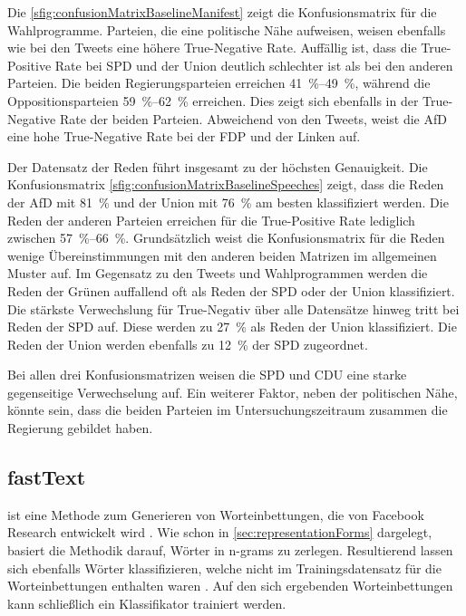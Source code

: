 Die \autoref{sfig:confusionMatrixBaselineManifest} zeigt die Konfusionsmatrix für die Wahlprogramme. Parteien, die eine politische Nähe aufweisen, weisen ebenfalls wie bei den Tweets eine höhere True-Negative Rate. Auffällig ist, dass die True-Positive Rate bei \ac{SPD} und der Union deutlich schlechter ist als bei den anderen Parteien. Die beiden Regierungsparteien erreichen \SIrange{41}{49}{\percent}, während die Oppositionsparteien \SIrange{59}{62}{\percent} erreichen. Dies zeigt sich ebenfalls in der True-Negative Rate der beiden Parteien. Abweichend von den Tweets, weist die \ac{AfD} eine hohe True-Negative Rate bei der \ac{FDP} und der Linken auf.

Der Datensatz der Reden führt insgesamt zu der höchsten Genauigkeit. Die Konfusionsmatrix \autoref{sfig:confusionMatrixBaselineSpeeches} zeigt, dass die Reden der \ac{AfD} mit \SI{81}{\percent} und der Union mit \SI{76}{\percent} am besten klassifiziert werden. Die Reden der anderen Parteien erreichen für die True-Positive Rate lediglich zwischen \SIrange{57}{66}{\percent}. Grundsätzlich weist die Konfusionsmatrix für die Reden wenige Übereinstimmungen mit den anderen beiden Matrizen im allgemeinen Muster auf. Im Gegensatz zu den Tweets und Wahlprogrammen werden die Reden der Grünen auffallend oft als Reden der \ac{SPD} oder der Union klassifiziert. Die stärkste Verwechslung für True-Negativ über alle Datensätze hinweg tritt bei Reden der \ac{SPD} auf. Diese werden zu \SI{27}{\percent} als Reden der Union klassifiziert. Die Reden der Union werden ebenfalls zu \SI{12}{\percent} der \ac{SPD} zugeordnet. 

Bei allen drei Konfusionsmatrizen weisen die \ac{SPD} und \ac{CDU} eine starke gegenseitige Verwechselung auf. Ein weiterer Faktor, neben der politischen Nähe, könnte sein, dass die beiden Parteien im Untersuchungszeitraum zusammen die Regierung gebildet haben.

\subsection{fastText}

\ft ist eine Methode zum Generieren von Worteinbettungen, die von Facebook Research entwickelt wird \autocite{joulin_bag_2016}. Wie schon in \autoref{sec:representationForms} dargelegt, basiert die Methodik darauf, Wörter in n-grams zu zerlegen. Resultierend lassen sich ebenfalls Wörter klassifizieren, welche nicht im Trainingsdatensatz für die Worteinbettungen enthalten waren \autocite{guhr_training_2020}. Auf den sich ergebenden Worteinbettungen kann schließlich ein Klassifikator trainiert werden.

